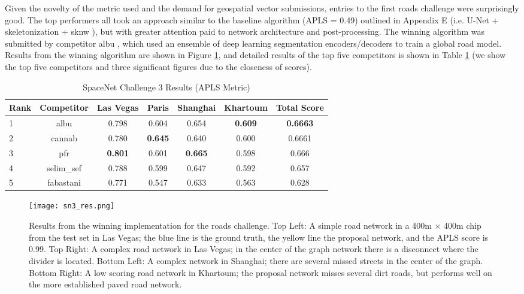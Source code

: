 \documentclass{article}
\begin{document}
Given the novelty of the metric used and the demand for geospatial vector submissions, entries to the first roads challenge were surprisingly good.
The top performers all took an approach similar to the baseline algorithm (APLS = 0.49) outlined in Appendix E (i.e. U-Net + skeletonization + sknw \cite{sknw}), but with greater attention paid to network architecture and post-processing. 
The winning algorithm was submitted by competitor albu \cite{albu},  which used an ensemble of deep learning segmentation encoders/decoders to train a global road model.  Results from the winning algorithm are shown in Figure \ref{fig:sn3_res}, and detailed results of the top five competitors is shown in Table \ref{tab:sn3_res} (we show the top five competitors and three significant figures due to the closeness of scores).

\begin{table}
  \caption{SpaceNet Challenge 3 Results (APLS Metric)}
  \label{tab:sn3_res}
  \centering
   \begin{tabular}{lcccccc}
    \toprule
    Rank & Competitor & Las Vegas & Paris & Shanghai & Khartoum & Total Score \\
    \hline
    1 & albu 	  & 0.798 & 0.604 & 0.654 & \bf{0.609} & \bf{0.6663} \\
    2 & cannab 	  & 0.780 & \bf{0.645} & 0.640 & 0.600 & 0.6661 \\
    3 & pfr 		  & \bf{0.801} & 0.601 & \bf{0.665} & 0.598 & 0.666 \\  
    4 & selim\_sef & 0.788 & 0.599 & 0.647 & 0.592 & 0.657 \\  
    5 & fabastani  & 0.771 & 0.547 & 0.633 & 0.563 & 0.628 \\  
    \bottomrule
  \end{tabular}
\end{table}



\begin{figure}
  \centering
     \texttt{[image: sn3\_res.png]}
  \caption{Results from the winning implementation for the roads challenge.  Top Left:  A simple road network in a 400m $\times$ 400m chip from the test set in Las Vegas; the blue line is the ground truth, the yellow line the proposal network, and the APLS score is 0.99. Top Right: A complex road network in Las Vegas; in the center of the graph network there is a disconnect where the divider is located.  Bottom Left: A complex network in Shanghai; there are several missed streets in the center of the graph. Bottom Right: A low scoring road network in Khartoum; the proposal network misses several dirt roads, but performs well on the more established paved road network.}
  \label{fig:sn3_res}
\end{figure}
\end{document}
